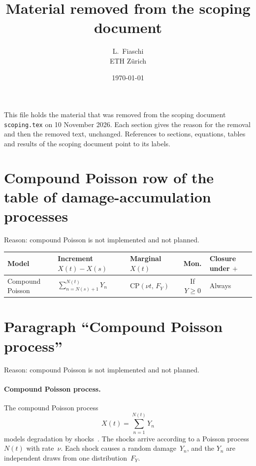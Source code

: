 \documentclass[11pt,a4paper]{article}
\theoremstyle{plain}
\theoremstyle{definition}
\theoremstyle{remark}
\begin{document}
\title{\textbf{Material removed from the scoping document}}
\author{L.\ Fiaschi \\ \small ETH Z\"urich}
\date{\today}
\maketitle

This file holds the material that was removed from the scoping document \texttt{scoping.tex} on 10 November 2026.
Each section gives the reason for the removal and then the removed text, unchanged.
References to sections, equations, tables and results of the scoping document point to its labels.

\section{Compound Poisson row of the table of damage-accumulation processes}

Reason: compound Poisson is not implemented and not planned.

\begin{center}
\small
\begin{tabularx}{\linewidth}{@{}>{\hsize=0.976\hsize\raggedright\arraybackslash}X>{\hsize=1.171\hsize\raggedright\arraybackslash}X>{\hsize=0.715\hsize\raggedright\arraybackslash}Xc>{\hsize=1.138\hsize\raggedright\arraybackslash}X@{}}
\toprule
\rowcolor{headgrey}
\textbf{Model} & \textbf{Increment} $X(t)-X(s)$ & \textbf{Marginal} $X(t)$ & \textbf{Mon.} & \textbf{Closure under $+$} \\
\midrule
Compound Poisson \cite{EsaryMarshallProschan1973,Wang2022}
  & $\sum_{n=N(s)+1}^{N(t)} Y_n$
  & $\mathrm{CP}(\nu t,\,F_Y)$
  & If $Y{\ge}0$
  & Always \\
\bottomrule
\end{tabularx}
\end{center}

\section{Paragraph ``Compound Poisson process''}

Reason: compound Poisson is not implemented and not planned.

\paragraph{Compound Poisson process.}
The compound Poisson process
\begin{equation}
  X(t) = \sum_{n=1}^{N(t)} Y_n
\end{equation}
models degradation by shocks~\cite{EsaryMarshallProschan1973}.
The shocks arrive according to a Poisson process $N(t)$ with rate~$\nu$.
Each shock causes a random damage~$Y_n$, and the $Y_n$ are independent draws from one distribution~$F_Y$.
\end{document}
